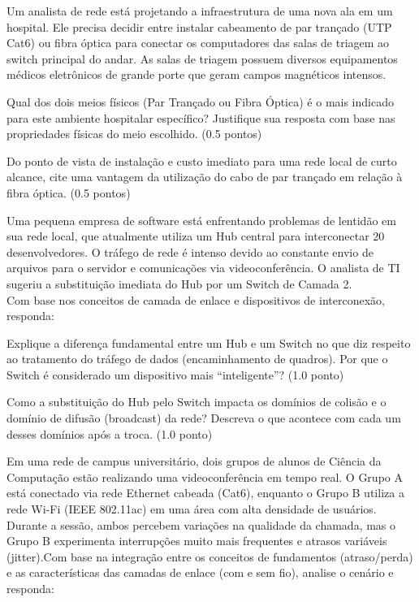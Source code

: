 \documentclass[11pt, addpoints]{modelo/prova2}
\begin{document}
\question[1] Um analista de rede está projetando a infraestrutura de uma nova ala em um hospital. Ele precisa decidir entre instalar cabeamento de par trançado (UTP Cat6) ou fibra óptica para conectar os computadores das salas de triagem ao switch principal do andar. As salas de triagem possuem diversos equipamentos médicos eletrônicos de grande porte que geram campos magnéticos intensos.
    \begin{choices}
        \item Qual dos dois meios físicos (Par Trançado ou Fibra Óptica) é o mais indicado para este ambiente hospitalar específico? Justifique sua resposta com base nas propriedades físicas do meio escolhido. (0.5 pontos)
        \item Do ponto de vista de instalação e custo imediato para uma rede local de curto alcance, cite uma vantagem da utilização do cabo de par trançado em relação à fibra óptica. (0.5 pontos)
    \end{choices}
\question[2] Uma pequena empresa de software está enfrentando problemas de lentidão em sua rede local, que atualmente utiliza um Hub central para interconectar 20 desenvolvedores. O tráfego de rede é intenso devido ao constante envio de arquivos para o servidor e comunicações via videoconferência. O analista de TI sugeriu a substituição imediata do Hub por um Switch de Camada 2.\\ Com base nos conceitos de camada de enlace e dispositivos de interconexão, responda:
    \begin{choices}
        \item Explique a diferença fundamental entre um Hub e um Switch no que diz respeito ao tratamento do tráfego de dados (encaminhamento de quadros). Por que o Switch é considerado um dispositivo mais ``inteligente''? (1.0 ponto)
        \item Como a substituição do Hub pelo Switch impacta os domínios de colisão e o domínio de difusão (broadcast) da rede? Descreva o que acontece com cada um desses domínios após a troca. (1.0 ponto)
    \end{choices}
\question[2] Em uma rede de campus universitário, dois grupos de alunos de Ciência da Computação estão realizando uma videoconferência em tempo real. O Grupo A está conectado via rede Ethernet cabeada (Cat6), enquanto o Grupo B utiliza a rede Wi-Fi (IEEE 802.11ac) em uma área com alta densidade de usuários. Durante a sessão, ambos percebem variações na qualidade da chamada, mas o Grupo B experimenta interrupções muito mais frequentes e atrasos variáveis (jitter).Com base na integração entre os conceitos de fundamentos (atraso/perda) e as características das camadas de enlace (com e sem fio), analise o cenário e responda:
\end{document}
